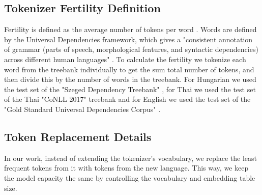 \subsection{Tokenizer Fertility Definition}\label{tokenizer fertility}
Fertility is defined as the average number of tokens per word \cite{acs2019}. Words are defined by the Universal Dependencies framework, which gives a "consistent annotation of grammar (parts of speech, morphological features, and syntactic dependencies) across different human languages" \cite{nivre-etal-2016-universal}. To calculate the fertility we tokenize each word from the treebank individually to get the sum total number of tokens, and then divide this by the number of words in the treebank. For Hungarian we used the test set of the "Szeged Dependency Treebank" \cite{vincze-etal-2010-hungarian}, for Thai we used the test set of the Thai "CoNLL 2017" treebank \cite{zeman-etal-2017-conll} and for English we used the test set of the "Gold Standard Universal Dependencies Corpus" \cite{silveira14gold}.

\subsection{Token Replacement Details} \label{token details}

In our work, instead of extending the tokenizer's vocabulary, we replace the least frequent tokens from it with tokens from the new language. This way, we keep the model capacity the same by controlling the vocabulary and embedding table size. 

